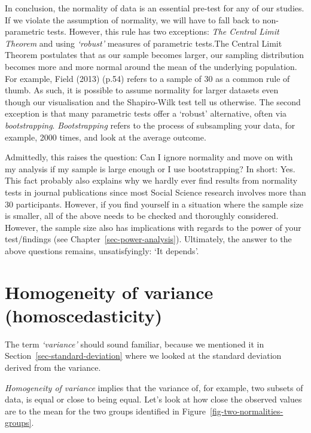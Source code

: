 \documentclass[
  letterpaper,
]{krantz}
\begin{document}
In conclusion, the normality of data is an essential pre-test for any of
our studies. If we violate the assumption of normality, we will have to
fall back to non-parametric tests. However, this rule has two
exceptions: \emph{The Central Limit Theorem} and using \emph{`robust'}
measures of parametric tests.The Central Limit Theorem postulates that
as our sample becomes larger, our sampling distribution becomes more and
more normal around the mean of the underlying population. For example,
Field (2013) (p.54) refers to a sample of 30 as a common rule of thumb.
As such, it is possible to assume normality for larger datasets even
though our visualisation and the Shapiro-Wilk test tell us otherwise.
The second exception is that many parametric tests offer a `robust'
alternative, often via \emph{bootstrapping}. \emph{Bootstrapping} refers
to the process of subsampling your data, for example, 2000 times, and
look at the average outcome.

Admittedly, this raises the question: Can I ignore normality and move on
with my analysis if my sample is large enough or I use bootstrapping? In
short: Yes. This fact probably also explains why we hardly ever find
results from normality tests in journal publications since most Social
Science research involves more than 30 participants. However, if you
find yourself in a situation where the sample size is smaller, all of
the above needs to be checked and thoroughly considered. However, the
sample size also has implications with regards to the power of your
test/findings (see Chapter~\ref{sec-power-analysis}). Ultimately, the
answer to the above questions remains, unsatisfyingly: `It depends'.

\section{Homogeneity of variance
(homoscedasticity)}\label{sec-homogeneity-of-variance}

The term \emph{`variance'} should sound familiar, because we mentioned
it in Section~\ref{sec-standard-deviation} where we looked at the
standard deviation derived from the variance.

\emph{Homogeneity of variance} implies that the variance of, for
example, two subsets of data, is equal or close to being equal. Let's
look at how close the observed values are to the mean for the two groups
identified in Figure~\ref{fig-two-normalities-groups}.
\end{document}
